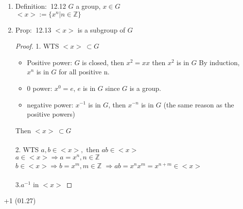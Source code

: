 \documentclass[12pt]{article}
\newcommand{\defi}{{\color{blue} Definition: $\ $}}
\newcommand{\prop}{{\color{blue} Prop: $\ $}}
\begin{document}
\begin{enumerate}
\begin{enumerate}
\begin{itemize}
            \item $H$ is subset of $G$
            \item $H$ closed under operation
        \end{itemize} 
        \begin{proof}
            $x \in H$ then we have to take $x,x^1,x^2 \dots ,x^n\dots$
            since we are closed under operation.\\
            $H$ is finite $\Rightarrow \exists m,n$ s.t. $x^n=x^m$\\
            Suppose $n \ge m, x^n=x^m$,\\
            $$x^n = x^mx^{n-m} = x^m$$
            $$\Rightarrow x^mx^{n-m} = x^me$$
            $$\Rightarrow x^{n-m} = e$$
            Then it guarantees that there is identity in $H$
        \end{proof}

        \item \defi 12.12 $G$ a group, $x\in G$\\
        $<x>:=\{x^n|n\in \mathbb{Z}\}$
        
        \item \prop 12.13 $<x>$ is a subgroup of $G$
        \begin{proof}
            1. WTS $<x>\ \subset G$ 
            \begin{itemize}
                \item Positive power: $G$ is closed, then $x^2 = xx$ then $x^2$ is in $G$ By induction, $x^n$ is in $G$ for all positive n.
                \item 0 power: $x^0 = e$, $e$ is in $G$ since $G$ is a group.
                \item negative power: $x^{-1}$ is in $G$, then $x^{-n}$ is in $G$ (the same reason as the positive powers)
            \end{itemize}
            Then $<x> \ \subset G$ \\ \\
            2. WTS $a,b \in <x>,$ then $ab \in <x>$\\
            $a \in <x> \Rightarrow a = x^n, n \in \mathbb{Z}$\\
            $b \in <x> \Rightarrow b = x^m, m \in \mathbb{Z}$
            $\Rightarrow ab = x^nx^m = x^{n+m} \in <x>$\\ \\
            3.$a^{-1}$ in $<x>$
        \end{proof}
    \end{enumerate}
+1 (01.27)
\end{enumerate}
\end{document}
